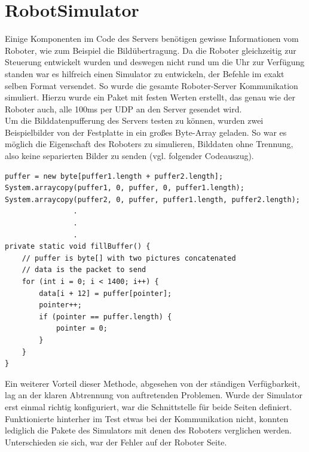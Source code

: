 \section{RobotSimulator}
Einige Komponenten im Code des Servers benötigen gewisse Informationen vom Roboter, wie zum Beispiel die Bildübertragung. Da die Roboter gleichzeitig zur Steuerung entwickelt wurden und deswegen nicht rund um die Uhr zur Verfügung standen war es hilfreich einen Simulator zu entwickeln, der Befehle im exakt selben Format versendet. So wurde die gesamte Roboter-Server Kommunikation simuliert. Hierzu wurde ein Paket mit festen Werten erstellt, das genau wie der Roboter auch, alle 100ms per UDP an den Server gesendet wird.\\
Um die Bilddatenpufferung des Servers testen zu können, wurden zwei Beispielbilder von der Festplatte in ein großes Byte-Array geladen. So war es möglich die Eigenschaft des Roboters zu simulieren, Bilddaten ohne Trennung, also keine separierten Bilder zu senden (vgl. folgender Codeauszug). \\

\begin{lstlisting}
puffer = new byte[puffer1.length + puffer2.length];
System.arraycopy(puffer1, 0, puffer, 0, puffer1.length);
System.arraycopy(puffer2, 0, puffer, puffer1.length, puffer2.length);
				.
				.
				.
private static void fillBuffer() {
	// puffer is byte[] with two pictures concatenated
	// data is the packet to send
	for (int i = 0; i < 1400; i++) {
		data[i + 12] = puffer[pointer];
		pointer++;
		if (pointer == puffer.length) {
			pointer = 0;
		}
	}
}
\end{lstlisting}

Ein weiterer Vorteil dieser Methode, abgesehen von der ständigen Verfügbarkeit, lag an der klaren Abtrennung von auftretenden Problemen. Wurde der Simulator erst einmal richtig konfiguriert, war die Schnittstelle für beide Seiten definiert. Funktionierte hinterher im Test etwas bei der Kommunikation nicht, konnten lediglich die Pakete des Simulators mit denen des Roboters verglichen werden. Unterschieden sie sich, war der Fehler auf der Roboter Seite.